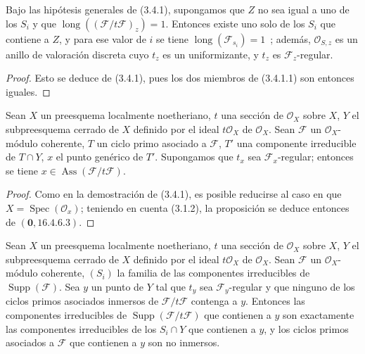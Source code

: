 \begin{corollary}[3.4.2]
\label{IV.2.3.4.2-fr}
Bajo las hipótesis generales de \textup{(3.4.1)}, supongamos que $Z$ no sea igual
a uno de los $S_i$ y que
$\operatorname{long}((\mathcal F/t\mathcal F)_z)=1$. Entonces existe uno solo
de los $S_i$ que contiene a $Z$, y para ese valor de $i$ se tiene
$\operatorname{long}(\mathcal F_{s_i})=1$~; además,
$\mathcal O_{S,z}$ es un anillo de valoración discreta cuyo $t_z$ es un
uniformizante, y $t_z$ es $\mathcal F_z$-regular.
\end{corollary}

\begin{proof}
Esto se deduce de (3.4.1), pues los dos miembros de (3.4.1.1) son entonces
iguales.
\end{proof}

\begin{proposition}[3.4.3]
\label{IV.2.3.4.3-fr}
Sean $X$ un preesquema localmente noetheriano, $t$ una sección de
$\mathcal O_X$ sobre $X$, $Y$ el subpreesquema cerrado de $X$ definido por
el ideal $t\mathcal O_X$ de $\mathcal O_X$. Sean $\mathcal F$ un
$\mathcal O_X$-módulo coherente, $T$ un ciclo primo asociado a $\mathcal F$,
$T'$ una componente irreducible de $T\cap Y$, $x$ el punto genérico de
$T'$. Supongamos que $t_x$ sea $\mathcal F_x$-regular; entonces se tiene
$x\in\operatorname{Ass}(\mathcal F/t\mathcal F)$.
\end{proposition}

\begin{proof}
Como en la demostración de (3.4.1), es posible reducirse al caso en que
$X=\operatorname{Spec}(\mathcal O_x)$; teniendo en cuenta (3.1.2), la
proposición se deduce entonces de $(\mathbf{0},16.4.6.3)$.
\end{proof}

\begin{proposition}[3.4.4]
\label{IV.2.3.4.4-fr}
Sean $X$ un preesquema localmente noetheriano, $t$ una sección de
$\mathcal O_X$ sobre $X$, $Y$ el subpreesquema cerrado de $X$ definido por
el ideal $t\mathcal O_X$ de $\mathcal O_X$. Sean $\mathcal F$ un
$\mathcal O_X$-módulo coherente, $(S_i)$ la familia de las componentes
irreducibles de $\operatorname{Supp}(\mathcal F)$. Sea $y$ un punto de $Y$
tal que $t_y$ sea $\mathcal F_y$-regular y que ninguno de los ciclos primos
asociados inmersos de $\mathcal F/t\mathcal F$ contenga a $y$. Entonces las
componentes irreducibles de $\operatorname{Supp}(\mathcal F/t\mathcal F)$ que
contienen a $y$ son exactamente las componentes irreducibles de los $S_i\cap Y$
que contienen a $y$, y los ciclos primos asociados a $\mathcal F$ que
contienen a $y$ son no inmersos.
\end{proposition}

